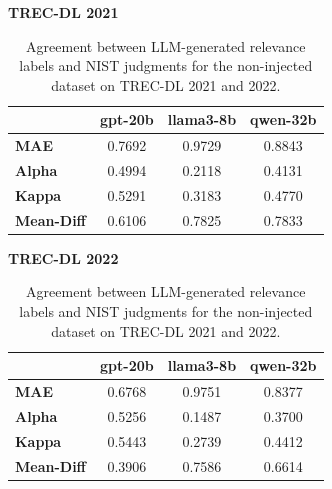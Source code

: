 \begin{table}
\centering
\caption{Agreement between LLM-generated relevance labels and NIST judgments for the non-injected dataset on TREC-DL 2021 and 2022.}
\label{tab:metrics_raw}
\setlength{\tabcolsep}{3.5pt}
\footnotesize

\textbf{TREC-DL 2021} \\
\vspace{0.2em}

\begin{tabular}{lccc}
\toprule
 & \textbf{gpt-20b} & \textbf{llama3-8b} & \textbf{qwen-32b} \\
\midrule
\textbf{MAE} & 0.7692 & 0.9729 & 0.8843 \\
\textbf{Alpha} & 0.4994 & 0.2118 & 0.4131 \\
\textbf{Kappa} & 0.5291 & 0.3183 & 0.4770 \\
\textbf{Mean-Diff} & 0.6106 & 0.7825 & 0.7833 \\
\bottomrule
\end{tabular}

\vspace{1em}

\textbf{TREC-DL 2022} \\
\vspace{0.2em}

\begin{tabular}{lccc}
\toprule
 & \textbf{gpt-20b} & \textbf{llama3-8b} & \textbf{qwen-32b} \\
\midrule
\textbf{MAE} & 0.6768 & 0.9751 & 0.8377 \\
\textbf{Alpha} & 0.5256 & 0.1487 & 0.3700 \\
\textbf{Kappa} & 0.5443 & 0.2739 & 0.4412 \\
\textbf{Mean-Diff} & 0.3906 & 0.7586 & 0.6614 \\
\bottomrule
\end{tabular}
\end{table}